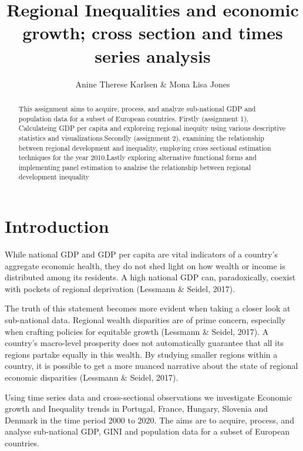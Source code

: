 \documentclass[
  a4paper,
  DIV=11,
  numbers=noendperiod]{scrartcl}
\title{Regional Inequalities and economic growth; cross section and
times series analysis}
\author{Anine Therese Karlsen \& Mona Lisa Jones}
\date{}
\begin{document}
\maketitle
\begin{abstract}
This assignment aims to acquire, process, and analyze sub-national GDP
and population data for a subset of European countries. Firstly
(assignment 1), Calculateing GDP per capita and exploreing regional
inequity using various descriptive statistics and
visualizations.Secondly (assignment 2), examining the relationship
between regional development and inequality, employing cross sectional
estimation techniques for the year 2010.Lastly exploring alternative
functional forms and implementing panel estimation to analzise the
relationship between regional development inequality
\end{abstract}
\ifdefined\Shaded\renewenvironment{Shaded}{\begin{tcolorbox}[frame hidden, boxrule=0pt, breakable, enhanced, sharp corners, borderline west={3pt}{0pt}{shadecolor}, interior hidden]}{\end{tcolorbox}}\fi

\hypertarget{introduction}{%
\section{Introduction}\label{introduction}}

While national GDP and GDP per capita are vital indicators of a
country's aggregate economic health, they do not shed light on how
wealth or income is distributed among its residents. A high national GDP
can, paradoxically, coexist with pockets of regional deprivation
(Lessmann \& Seidel, 2017).

The truth of this statement becomes more evident when taking a closer
look at sub-national data. Regional wealth disparities are of prime
concern, especially when crafting policies for equitable growth
(Lessmann \& Seidel, 2017). A country's macro-level prosperity does not
automatically guarantee that all its regions partake equally in this
wealth. By studying smaller regions within a country, it is possible to
get a more nuanced narrative about the state of regional economic
disparities (Lessmann \& Seidel, 2017).

Using time series data and cross-sectional observations we investigate
Economic growth and Inequality trends in Portugal, France, Hungary,
Slovenia and Denmark in the time period 2000 to 2020. The aims are to
acquire, process, and analyse sub-national GDP, GINI and population data
for a subset of European countries.
\end{document}
